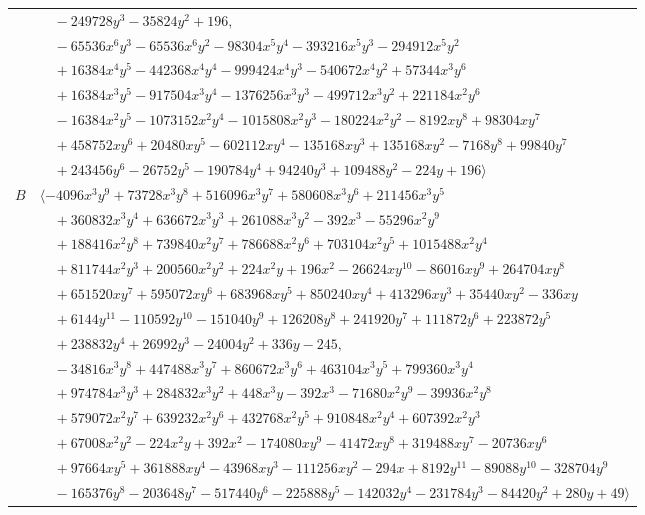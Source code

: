 \documentclass[11pt]{article}
\begin{document}
\begin{longtable}{@{}ll@{}}
 & $\quad -249728y^{3}-35824y^{2}+196,$\\
 & $\quad -65536x^{6}y^{3}-65536x^{6}y^{2}-98304x^{5}y^{4}-393216x^{5}y^{3}-294912x^{5}y^{2}$\\
 & $\quad +16384x^{4}y^{5}-442368x^{4}y^{4}-999424x^{4}y^{3}-540672x^{4}y^{2}+57344x^{3}y^{6}$\\
 & $\quad +16384x^{3}y^{5}-917504x^{3}y^{4}-1376256x^{3}y^{3}-499712x^{3}y^{2}+221184x^{2}y^{6}$\\
 & $\quad -16384x^{2}y^{5}-1073152x^{2}y^{4}-1015808x^{2}y^{3}-180224x^{2}y^{2}-8192xy^{8}+98304xy^{7}$\\
 & $\quad +458752xy^{6}+20480xy^{5}-602112xy^{4}-135168xy^{3}+135168xy^{2}-7168y^{8}+99840y^{7}$\\
 & $\quad +243456y^{6}-26752y^{5}-190784y^{4}+94240y^{3}+109488y^{2}-224y+196\rangle$\\
$B$ & $\langle -4096x^{3}y^{9}+73728x^{3}y^{8}+516096x^{3}y^{7}+580608x^{3}y^{6}+211456x^{3}y^{5}$\\
 & $\quad +360832x^{3}y^{4}+636672x^{3}y^{3}+261088x^{3}y^{2}-392x^{3}-55296x^{2}y^{9}$\\
 & $\quad +188416x^{2}y^{8}+739840x^{2}y^{7}+786688x^{2}y^{6}+703104x^{2}y^{5}+1015488x^{2}y^{4}$\\
 & $\quad +811744x^{2}y^{3}+200560x^{2}y^{2}+224x^{2}y+196x^{2}-26624xy^{10}-86016xy^{9}+264704xy^{8}$\\
 & $\quad +651520xy^{7}+595072xy^{6}+683968xy^{5}+850240xy^{4}+413296xy^{3}+35440xy^{2}-336xy$\\
 & $\quad +6144y^{11}-110592y^{10}-151040y^{9}+126208y^{8}+241920y^{7}+111872y^{6}+223872y^{5}$\\
 & $\quad +238832y^{4}+26992y^{3}-24004y^{2}+336y-245,$\\
 & $\quad -34816x^{3}y^{8}+447488x^{3}y^{7}+860672x^{3}y^{6}+463104x^{3}y^{5}+799360x^{3}y^{4}$\\
 & $\quad +974784x^{3}y^{3}+284832x^{3}y^{2}+448x^{3}y-392x^{3}-71680x^{2}y^{9}-39936x^{2}y^{8}$\\
 & $\quad +579072x^{2}y^{7}+639232x^{2}y^{6}+432768x^{2}y^{5}+910848x^{2}y^{4}+607392x^{2}y^{3}$\\
 & $\quad +67008x^{2}y^{2}-224x^{2}y+392x^{2}-174080xy^{9}-41472xy^{8}+319488xy^{7}-20736xy^{6}$\\
 & $\quad +97664xy^{5}+361888xy^{4}-43968xy^{3}-111256xy^{2}-294x+8192y^{11}-89088y^{10}-328704y^{9}$\\
 & $\quad -165376y^{8}-203648y^{7}-517440y^{6}-225888y^{5}-142032y^{4}-231784y^{3}-84420y^{2}+280y+49\rangle$\\

\end{longtable}
\end{document}
